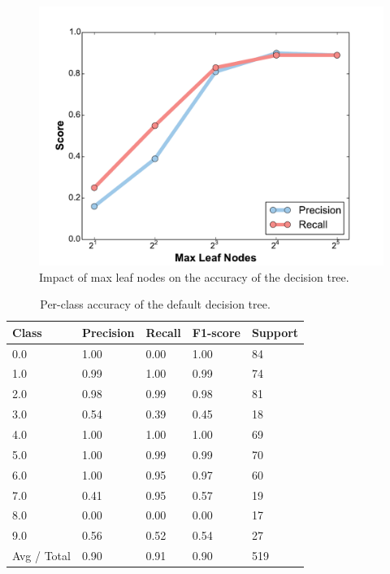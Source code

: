 \begin{figure}[h!]
    \centering
	\includegraphics[width=0.7\linewidth]{figure/leaves.pdf}
	\caption{Impact of max leaf nodes on the accuracy of the decision tree.}
\end{figure}

\begin{table}[h!]
\centering
\small{
  \centering
  \begin{tabular}{l|llll} 
	\toprule
   		Class &  Precision  &  Recall &  F1-score  &  Support  \\    
    \midrule
		0.0   &    1.00   &   0.00   &   1.00   &     84   \\
        1.0   &    0.99   &   1.00   &   0.99   &     74   \\
        2.0   &    0.98   &   0.99   &   0.98   &     81   \\
        3.0   &    0.54   &   0.39   &   0.45   &     18   \\
        4.0   &    1.00   &   1.00   &   1.00   &     69   \\
        5.0   &    1.00   &   0.99   &   0.99   &     70   \\
        6.0   &    1.00   &   0.95   &   0.97   &     60   \\
        7.0   &    0.41   &   0.95   &   0.57   &     19   \\
        8.0   &    0.00   &   0.00   &   0.00   &     17   \\
        9.0   &    0.56   &   0.52   &   0.54   &     27   \\
    \midrule
Avg / Total   &    0.90   &   0.91   &   0.90   &    519   \\
   \bottomrule
   \end{tabular}
 }
\caption{Per-class accuracy of the default decision tree.}
\label{tab:dt_stats}
\end{table}



